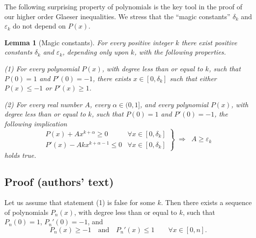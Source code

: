 \documentclass[11pt]{article}
\newtheorem{lemma}{Lemma}
\begin{document}
The following surprising property of polynomials is the key tool in the proof of our higher order
Glaeser inequalities. We stress that the ``magic constants'' $\delta_k$ and $\varepsilon_k$ do not
depend on $P(x)$.

\renewcommand{\thelemma}{3.3}
\begin{lemma}[Magic constants]
\emph{For every positive integer $k$ there exist positive constants $\delta_k$ and $\varepsilon_k$,
depending only upon $k$, with the following properties.}

(1) \emph{For every polynomial $P(x)$, with degree less than or equal to $k$, such that $P(0)=1$
and $P'(0)=-1$, there exists $x \in [0,\delta_k]$ such that either $P(x) \le -1$ or
$P'(x) \ge 1$.}

(2) \emph{For every real number $A$, every $\alpha \in (0,1]$, and every polynomial $P(x)$, with
degree less than or equal to $k$, such that $P(0)=1$ and $P'(0)=-1$, the following implication}
\begin{equation}
\left.
\begin{array}{ll}
P(x)+Ax^{k+\alpha} \ge 0 & \forall x \in [0,\delta_k]\\[3pt]
P'(x)-Akx^{k+\alpha-1} \le 0 & \forall x \in [0,\delta_k]
\end{array}
\right\}
\;\Longrightarrow\;
\boxed{\;A \ge \varepsilon_k\;}
\tag{3.2}
\end{equation}
\emph{holds true.}
\end{lemma}


\subsection*{Proof (authors' text)}

Let us assume that statement (1) is false for some $k$. Then there exists a sequence of polynomials
$P_n(x)$, with degree less than or equal to $k$, such that $P_n(0)=1$, $P_n'(0)=-1$, and
\begin{equation}
P_n(x) \ge -1 \quad\text{and}\quad P_n'(x) \le 1 \qquad \forall x \in [0,n]. \tag{3.3}
\end{equation}

\end{document}
